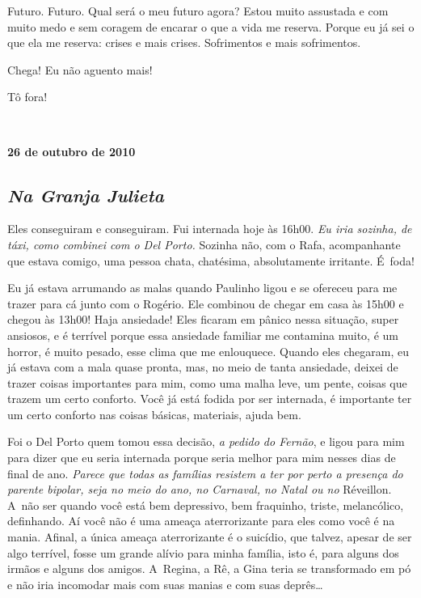 Futuro. Futuro. Qual será o meu futuro agora? Estou muito assustada e
com muito medo e sem coragem de encarar o que a vida me reserva. Porque
eu já sei o que ela me reserva: crises e mais crises. Sofrimentos e mais
sofrimentos.

Chega! Eu não aguento mais!

Tô fora!

\begin{center}\asterisc{}​\end{center}

\begin{flushright}\textbf{26 de outubro de 2010}\end{flushright}


\subsection{\emph{Na Granja Julieta}}

Eles conseguiram e conseguiram. Fui internada hoje às 16h00. \emph{Eu
iria sozinha, de táxi, como combinei com o Del Porto.} Sozinha não, com
o Rafa, acompanhante que estava comigo, uma pessoa chata, chatésima,
absolutamente irritante. É~foda!

Eu já estava arrumando as malas quando Paulinho ligou e se ofereceu para
me trazer para cá junto com o Rogério. Ele combinou de chegar em casa às
15h00 e chegou às 13h00! Haja ansiedade! Eles ficaram em pânico nessa
situação, super ansiosos, e é terrível porque essa ansiedade familiar me
contamina muito, é um horror, é muito pesado, esse clima que me
enlouquece. Quando eles chegaram, eu já estava com a mala quase pronta,
mas, no meio de tanta ansiedade, deixei de trazer coisas importantes
para mim, como uma malha leve, um pente, coisas que trazem um certo
conforto. Você já está fodida por ser internada, é importante ter um
certo conforto nas coisas básicas, materiais, ajuda bem.

Foi o Del Porto quem tomou essa decisão, \emph{a pedido do Fernão}, e
ligou para mim para dizer que eu seria internada porque seria melhor
para mim nesses dias de final de ano. \emph{Parece que todas as famílias
resistem a ter por perto a presença do parente bipolar, seja no meio do
ano, no Carnaval, no Natal ou no}\textbf{} Réveillon. A~não ser quando
você está bem depressivo, bem fraquinho, triste, melancólico,
definhando. Aí você não é uma ameaça aterrorizante para eles como você é
na mania. Afinal, a única ameaça aterrorizante é o suicídio, que talvez,
apesar de ser algo terrível, fosse um grande alívio para minha família,
isto é, para alguns dos irmãos e alguns dos amigos. A~Regina, a Rê, a
Gina teria se transformado em pó e não iria incomodar mais com suas
manias e com suas deprês…

